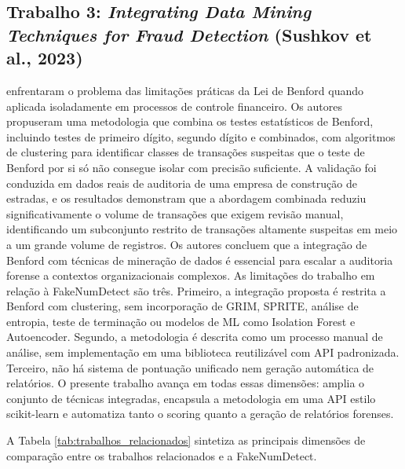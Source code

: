 \documentclass[
    12pt,                %
    openright,           %
    oneside,             %
    a4paper,             %
    english,             %
    brazil               %
]{abntex2}
\begin{document}
\subsection{Trabalho 3: \textit{Integrating Data Mining Techniques for Fraud Detection} (Sushkov et al., 2023)}
 enfrentaram o problema das limitações práticas da Lei de Benford quando aplicada isoladamente em processos de controle financeiro. Os autores propuseram uma metodologia que combina os testes estatísticos de Benford, incluindo testes de primeiro dígito, segundo dígito e combinados, com algoritmos de clustering para identificar classes de transações suspeitas que o teste de Benford por si só não consegue isolar com precisão suficiente.
A validação foi conduzida em dados reais de auditoria de uma empresa de construção de estradas, e os resultados demonstram que a abordagem combinada reduziu significativamente o volume de transações que exigem revisão manual, identificando um subconjunto restrito de transações altamente suspeitas em meio a um grande volume de registros. Os autores concluem que a integração de Benford com técnicas de mineração de dados é essencial para escalar a auditoria forense a contextos organizacionais complexos.
As limitações do trabalho em relação à FakeNumDetect são três. Primeiro, a integração proposta é restrita a Benford com clustering, sem incorporação de GRIM, SPRITE, análise de entropia, teste de terminação ou modelos de ML como Isolation Forest e Autoencoder. Segundo, a metodologia é descrita como um processo manual de análise, sem implementação em uma biblioteca reutilizável com API padronizada. Terceiro, não há sistema de pontuação unificado nem geração automática de relatórios. O presente trabalho avança em todas essas dimensões: amplia o conjunto de técnicas integradas, encapsula a metodologia em uma API estilo scikit-learn e automatiza tanto o scoring quanto a geração de relatórios forenses.

\vspace{0.5cm}

A Tabela \ref{tab:trabalhos_relacionados} sintetiza as principais dimensões de comparação entre os trabalhos relacionados e a FakeNumDetect.
\end{document}
